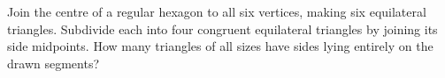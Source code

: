 Join the centre of a regular hexagon to all six vertices, making six equilateral triangles. Subdivide each into four congruent equilateral triangles by joining its side midpoints. How many triangles of all sizes have sides lying entirely on the drawn segments?
